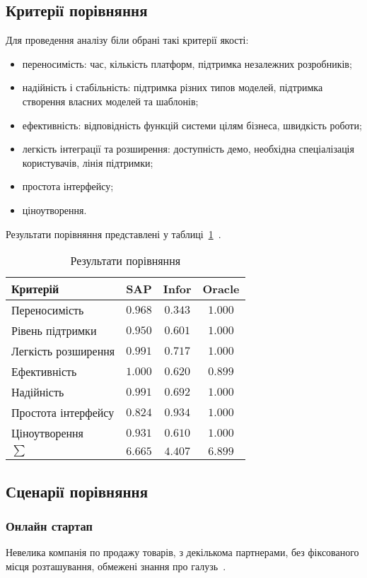 \subsection{Критерії порівняння}
Для проведення аналізу біли обрані такі критерії якості:
\begin{itemize}
	\item переносимість: час, кількість платформ, підтримка незалежних розробників;
	\item надійність і стабільність: підтримка різних типов моделей, підтримка створення власних моделей та шаблонів; 
	\item ефективність: відповідність функцій системи цілям бізнеса, швидкість роботи;
	\item легкість інтеграції та розширення: доступність демо, необхідна спеціалізація користувачів, лінія підтримки;
	\item простота інтерфейсу;
	\item ціноутворення.
\end{itemize}

Результати порівняння представлені у таблиці~\ref{tab:results}~\cite{Wanga}.

\begin{table}[H]
	\caption{Результати порівняння}
	\label{tab:results}
	\begin{tabular}{l|c|c|c}
		Критерій & SAP & Infor & Oracle \\\hline
		Переносимість & $0.968$ & $0.343$ & $1.000$ \\
		Рівень підтримки & $0.950$ & $0.601$ & $1.000$ \\
		Легкість розширення & $0.991$ & $0.717$ & $1.000$ \\
		Ефективність & $1.000$ & $0.620$ & $0.899$ \\
		Надійність & $0.991$ & $0.692$ & $1.000$ \\
		Простота інтерфейсу & $0.824$ & $0.934$ & $1.000$ \\
		Ціноутворення & $0.931$ & $0.610$ & $1.000$ \\\hline
		$\sum$ & $6.665$ & $4.407$ & $6.899$ \\
	\end{tabular}
\end{table}

\subsection{Сценарії порівняння}
\subsubsection{Онлайн стартап}
Невелика компанія по продажу товарів, з декількома партнерами, без фіксованого місця розташування, обмежені знання про галузь~\cite{Wanga}.

